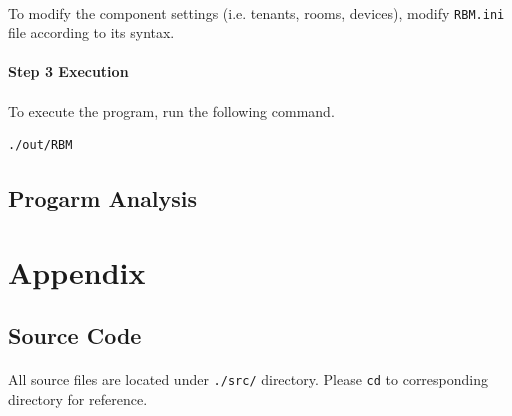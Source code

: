 \documentclass{article}
\begin{document}
            \paragraph{}
                To modify the component settings (i.e. tenants, rooms, devices),
                modify \texttt{RBM.ini} file according to its syntax.
            \paragraph{Step 3 Execution}
            \paragraph{}
                To execute the program, run the following command.
            \begin{Verbatim}[gobble=8]
                ./out/RBM
            \end{Verbatim}

        \subsection{Progarm Analysis}
            
    \cleardoublepage
    \section{Appendix}
        \subsection{Source Code}
            \paragraph{}
                All source files are located under \texttt{./src/} directory. Please \texttt{cd}
                to corresponding directory for reference.
\end{document}
